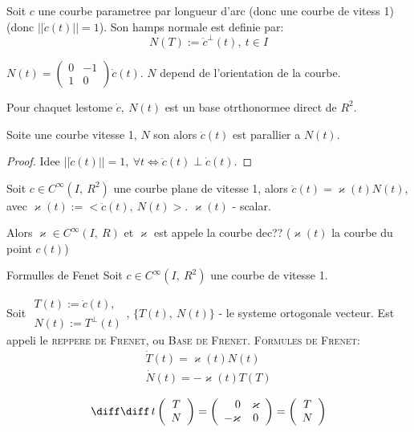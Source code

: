 \begin{definition}
	Soit $c$ une courbe parametree par longueur d'arc (donc une courbe de vitess 1) (donc $||\dot{c}(t)||=1$). Son hamps normale est definie par:
	$$N(T):=\dot{c}^\perp(t),\ t\in I$$
\end{definition}

\begin{remark}
$N(t)=\left(\begin{array}{cr} 0 & -1 \\ 1 & 0\end{array}\right)\dot{c}(t)$. $N$ depend de l'orientation de la courbe.
\end{remark}

Pour chaquet lestome ${\dot{c},\ N(t)}$ est un base otrthonormee direct de $R^2$.

\begin{lemme}
	Soite une courbe vitesse 1, $N$ son alors $\ddot{c}(t)$ est parallier a $N(t)$.
\end{lemme}
\begin{proof}
	Idee $||\dot{c}(t)||=1,\ \forall t \Longleftrightarrow \ddot{c}(t)\perp\dot{c}(t)$.
\end{proof}

\begin{definition}
	Soit $c\in C^\infty(I,\ R^2)$ une courbe plane de vitesse 1, alors $\ddot{c}(t)=\varkappa(t)N(t)$, avec $\varkappa(t):=<\ddot{c}(t),\ N(t)>$.
	$\varkappa(t)$ - scalar.
	
	Alors $\varkappa\in C^\infty (I,\ R)$ et $\varkappa$ est appele la courbe dec?? ($\varkappa(t)$ la courbe du point $c(t)$)
\end{definition}

\begin{theorem}{Formulles de Fenet}
	Soit $c\in C^\infty(I,\ R^2)$ une courbe de vitesse 1.
	
	Soit $\begin{array}{c}T(t):=\dot{c}(t),\\ N(t):=T^\perp (t) \end{array}$, $\{T(t),\ N(t)\}$ - le systeme ortogonale vecteur. Est appeli le \textsc{reppere de Frenet}, ou \textsc{Base de Frenet}. \textsc{Formules de Frenet}:
	$$\begin{array}{c}\dot{T}(t)=\varkappa(t)N(t)\\ \dot{N}(t)=-\varkappa(t)T(T)\end{array}$$
\end{theorem}

\begin{remark}
	$$\frak{\diff}{\diff\, t}\left(
	\begin{array}{c}
		T\\N\end{array}\right) = \left(\begin{array}{rc}0 & \varkappa\\
		-\varkappa & 0
	\end{array}
	\right)=\left(\begin{array}{c}T\\N\end{array}\right)$$
\end{remark}

